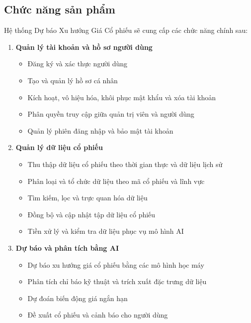 \documentclass[12pt, a4paper]{article}
\begin{document}
\subsection{Chức năng sản phẩm}

Hệ thống Dự báo Xu hướng Giá Cổ phiếu sẽ cung cấp các chức năng chính sau:

\begin{enumerate}[label=\arabic*), leftmargin=0pt, itemindent=2em]

    \item \textbf{Quản lý tài khoản và hồ sơ người dùng}
          \begin{itemize}[leftmargin=2.5em]
              \item Đăng ký và xác thực người dùng
              \item Tạo và quản lý hồ sơ cá nhân
              \item Kích hoạt, vô hiệu hóa, khôi phục mật khẩu và xóa tài khoản
              \item Phân quyền truy cập giữa quản trị viên và người dùng
              \item Quản lý phiên đăng nhập và bảo mật tài khoản
          \end{itemize}

    \item \textbf{Quản lý dữ liệu cổ phiếu}
          \begin{itemize}[leftmargin=2.5em]
              \item Thu thập dữ liệu cổ phiếu theo thời gian thực và dữ liệu lịch sử
              \item Phân loại và tổ chức dữ liệu theo mã cổ phiếu và lĩnh vực
              \item Tìm kiếm, lọc và trực quan hóa dữ liệu
              \item Đồng bộ và cập nhật tập dữ liệu cổ phiếu
              \item Tiền xử lý và kiểm tra dữ liệu phục vụ mô hình AI
          \end{itemize}

    \item \textbf{Dự báo và phân tích bằng AI}
          \begin{itemize}[leftmargin=2.5em]
              \item Dự báo xu hướng giá cổ phiếu bằng các mô hình học máy
              \item Phân tích chỉ báo kỹ thuật và trích xuất đặc trưng dữ liệu
              \item Dự đoán biến động giá ngắn hạn
              \item Đề xuất cổ phiếu và cảnh báo cho người dùng
          \end{itemize}


\end{enumerate}
\end{document}

